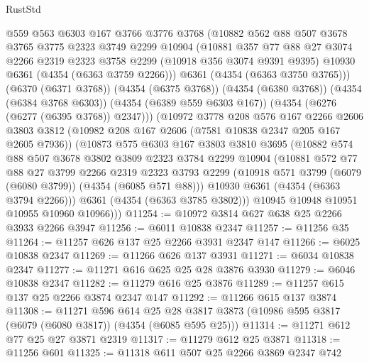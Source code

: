 \begin{lexlean}{RustStd}
\begin{coremodule}
        @559
        @563
        @6303
        @167
        @3766
        @3776
        @3768
        (@10882
          @562
          @88
          @507
          @3678
          @3765
          @3775
          @2323
          @3749
          @2299
          @10904
          (@10881
            @357
            @77
            @88
            @27
            @3074
            @2266
            @2319
            @2323
            @3758
            @2299
            (@10918 @356 @3074 @9391 @9395)
            @10930
            @6361
            (@4354 (@6363 @3759 @2266)))
          @6361
          (@4354 (@6363 @3750 @3765)))
        (@6370 (@6371 @3768))
        (@4354 (@6375 @3768))
        (@4354 (@6380 @3768))
        (@4354 (@6384 @3768 @6303))
        (@4354 (@6389 @559 @6303 @167))
        (@4354 (@6276 (@6277 (@6395 @3768)) @2347)))
      (@10972
        @3778
        @208
        @576
        @167
        @2266
        @2606
        @3803
        @3812
        (@10982 @208 @167 @2606 (@7581 @10838 @2347 @205 @167 @2605 @7936))
        (@10873
          @575
          @6303
          @167
          @3803
          @3810
          @3695
          (@10882
            @574
            @88
            @507
            @3678
            @3802
            @3809
            @2323
            @3784
            @2299
            @10904
            (@10881
              @572
              @77
              @88
              @27
              @3799
              @2266
              @2319
              @2323
              @3793
              @2299
              (@10918 @571 @3799 (@6079 (@6080 @3799)) (@4354 (@6085 @571 @88)))
              @10930
              @6361
              (@4354 (@6363 @3794 @2266)))
            @6361
            (@4354 (@6363 @3785 @3802)))
          @10945
          @10948
          @10951
          @10955
          @10960
          @10966)))
@11254 := @10972 @3814 @627 @638 @25 @2266 @3933 @2266 @3947
@11256 := @6011 @10838 @2347
@11257 := @11256 @35
@11264 := @11257 @626 @137 @25 @2266 @3931 @2347 @147
@11266 := @6025 @10838 @2347
@11269 := @11266 @626 @137 @3931
@11271 := @6034 @10838 @2347
@11277 := @11271 @616 @625 @25 @28 @3876 @3930
@11279 := @6046 @10838 @2347
@11282 := @11279 @616 @25 @3876
@11289 := @11257 @615 @137 @25 @2266 @3874 @2347 @147
@11292 := @11266 @615 @137 @3874
@11308 := @11271
    @596
    @614
    @25
    @28
    @3817
    @3873
    (@10986 @595 @3817 (@6079 (@6080 @3817)) (@4354 (@6085 @595 @25)))
@11314 := @11271 @612 @77 @25 @27 @3871 @2319
@11317 := @11279 @612 @25 @3871
@11318 := @11256 @601
@11325 := @11318 @611 @507 @25 @2266 @3869 @2347 @742

\end{coremodule}
\end{lexlean}
